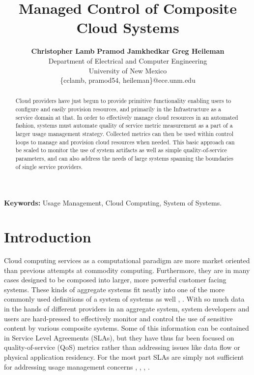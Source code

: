 \documentclass[times, 10pt,twocolumn]{article}
\begin{document}
\title{Managed Control of Composite Cloud Systems}

\author{
        \textbf{Christopher Lamb}\hspace*{0.3in}
        \textbf{Pramod Jamkhedkar}\hspace*{0.3in}
        \textbf{Greg Heileman}\\
        Department of Electrical and Computer Engineering \\
        University of New Mexico \\
        \small{\{cclamb, pramod54, heileman\}@ece.unm.edu}
}

\maketitle
\thispagestyle{empty}

\begin{abstract}
Cloud providers have just begun to provide primitive functionality enabling users to configure and easily provision resources, and primarily in the Infrastructure as a service domain at that.  In order to effectively manage cloud resources in an automated fashion, systems must automate quality of service metric measurement as a part of a larger usage management strategy.  Collected metrics can then be used within control loops to manage and provision cloud resources when needed.  This basic approach can be scaled to monitor the use of system artifacts as well as simple quality-of-service parameters, and can also address the needs of large systems spanning the boundaries of single service providers.
\end{abstract}

{
\setlength{\parindent}{0mm}
\textbf{Keywords:} Usage Management, Cloud Computing, System of Systems.
}

\section{Introduction}
Cloud computing services as a computational paradigm are more market oriented than previous attempts at commodity computing.  Furthermore, they are in many cases designed to be composed into larger, more powerful customer facing systems.  These kinds of aggregate systems fit neatly into one of the more commonly used definitions of a system of systems as well \cite{Sose:SageCuppan:2001}, \cite{Sose:Web:Defns}.  With so much data in the hands of different providers in an aggregate system, system developers and users are hard-pressed to effectively monitor and control the use of sensitive content by various composite systems.  Some of this information can be contained in Service Level Agreements (SLAs), but they have thus far been focused on quality-of-service (QoS) metrics rather than addressing issues like data flow or physical application residency.  For the most part SLAs are simply not sufficient for addressing usage management concerns \cite{WSA}, \cite{WSLA}, \cite{WSP}, \cite{PaRaSh:09}.
\end{document}
